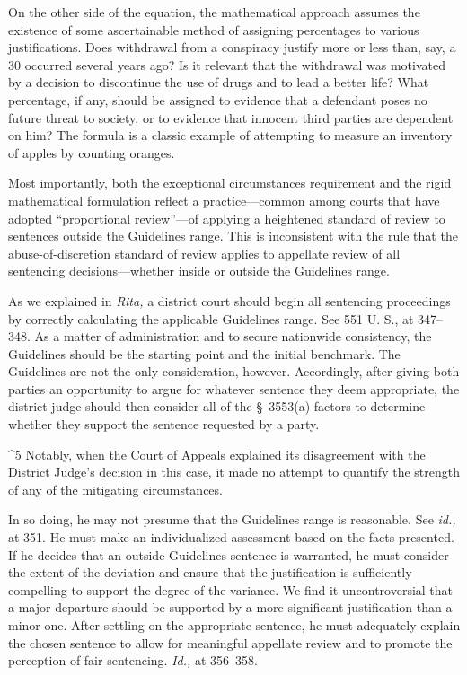   On the other side of the equation, the mathematical approach assumes
the existence of some ascertainable method of assigning percentages to
various justifications. Does withdrawal from a conspiracy justify more
or less than, say, a 30%
occurred several years ago? Is it relevant that the withdrawal was
motivated by a decision to discontinue the use of drugs and to lead a
better life? What percentage, if any, should be assigned to evidence
that a defendant poses no future threat to society, or to evidence that
innocent third parties are dependent on him? The formula is a classic
example of attempting to measure an inventory of apples by counting
oranges.\footnotemark[5]

  Most importantly, both the exceptional circumstances requirement
and the rigid mathematical formulation reflect a practice---common
among courts that have adopted ``proportional review''---of applying
a heightened standard of review to sentences outside the Guidelines
range. This is inconsistent with the rule that the abuse-of-discretion
standard of review applies to appellate review of all sentencing
decisions---whether inside or outside the Guidelines range.

  As we explained in \emph{Rita,} a district court should begin all
sentencing proceedings by correctly calculating the applicable
Guidelines range. See 551 U. S., at 347--348. As a matter of
administration and to secure nationwide consistency, the Guidelines
should be the starting point and the initial benchmark. The Guidelines
are not the only consideration, however. Accordingly, after giving
both parties an opportunity to argue for whatever sentence they deem
appropriate, the district judge should then consider all of the
\S~3553(a) \newpage  factors to determine whether they support the
sentence requested by a party.\footnotemark[6]


^5 Notably, when the Court of Appeals explained its disagreement with
the District Judge's decision in this case, it made no attempt to
quantify the strength of any of the mitigating circumstances.

      In so doing, he may not presume that the Guidelines range is
reasonable. See \emph{id.,} at 351. He must make an individualized
assessment based on the facts presented. If he decides that an
outside-Guidelines sentence is warranted, he must consider the extent
of the deviation and ensure that the justification is sufficiently
compelling to support the degree of the variance. We find it
uncontroversial that a major departure should be supported by a more
significant justification than a minor one. After settling on the
appropriate sentence, he must adequately explain the chosen sentence to
allow for meaningful appellate review and to promote the perception of
fair sentencing. \emph{Id.,} at 356--358.



